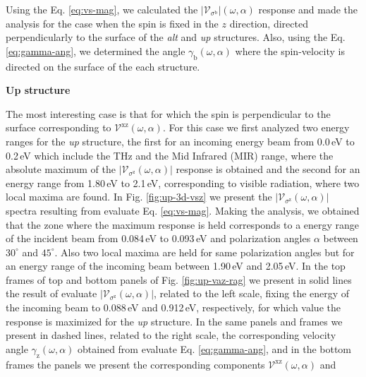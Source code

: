 \documentclass[prb,11pt,tightenlines,twocolumn,aps]{revtex4-1}
\begin{document}

Using the Eq. \eqref{eq:vs-mag}, we calculated the
$|\mathcal{V}_{\sigma^{\mathrm{b}}}|(\omega,\alpha)$ response and made the
analysis for the case when the spin is fixed in the $z$ direction, directed
perpendicularly to the surface of the \emph{alt} and \emph{up} structures. Also,
using the Eq. \eqref{eq:gamma-ang}, we determined the angle
$\gamma_{\mathrm{b}}(\omega,\alpha)$ where the spin-velocity is directed on the
surface of the each structure.

\textbf{Up structure}

The most interesting case is that for which the spin is perpendicular to the
surface corresponding to $\mathcal{V}^{\mathrm{xz}}(\omega,\alpha)$.
% 
For this case we first analyzed two energy ranges for the \emph{up} structure,
the first for an incoming energy beam from 0.0\,eV to 0.2\,eV which include the
THz and the Mid Infrared (MIR) range, where the absolute maximum of the
$|\mathcal{V}_{\sigma^{\mathrm{z}}}(\omega,\alpha)|$ response is obtained and
the second for an energy range from 1.80\,eV to 2.1\,eV, corresponding to
visible radiation, where two local maxima are found.
% 
In Fig. \ref{fig:up-3d-vsz} we present the
$|\mathcal{V}_{\sigma^{\mathrm{z}}}(\omega,\alpha)|$ spectra resulting from
evaluate Eq. \eqref{eq:vs-mag}.
% 
Making the analysis, we obtained that the zone where the maximum response is
held corresponds to a energy range of the incident beam from 0.084\,eV to
0.093\,eV and polarization angles $\alpha$ between $30^{\circ}$ and
$45^{\circ}$. Also two local maxima are held for same polarization angles but
for an energy range of the incoming beam between 1.90\,eV and 2.05\,eV.
In the top frames of top and bottom panels of Fig. \ref{fig:up-vaz-rag} we
present in solid lines the result of evaluate
$|\mathcal{V}_{\sigma^{\mathrm{z}}}(\omega,\alpha)|$, related to the left scale,
fixing the energy of the incoming beam to 0.088\,eV and 0.912\,eV, respectively,
for which value the response is maximized for the \emph{up} structure. In the
same panels and frames we present in dashed lines, related to the right scale,
the corresponding velocity angle $\gamma_{\mathrm{z}}(\omega,\alpha)$ obtained
from evaluate Eq. \eqref{eq:gamma-ang}, and in the bottom frames the
panels we present the corresponding components
$\mathcal{V}^{\mathrm{xz}}(\omega,\alpha)$ and
\end{document}
